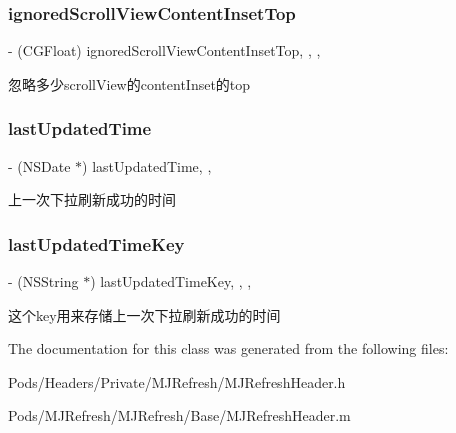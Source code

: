 \subsubsection{\texorpdfstring{ignored\+Scroll\+View\+Content\+Inset\+Top}{ignoredScrollViewContentInsetTop}}
{\footnotesize\ttfamily -\/ (C\+G\+Float) ignored\+Scroll\+View\+Content\+Inset\+Top\hspace{0.3cm}{\ttfamily [read]}, {\ttfamily [write]}, {\ttfamily [nonatomic]}, {\ttfamily [assign]}}

忽略多少scroll\+View的content\+Inset的top \mbox{\label{interface_m_j_refresh_header_ad673d647b3f6bbb11230437a7e739c3a}} 
\subsubsection{\texorpdfstring{last\+Updated\+Time}{lastUpdatedTime}}
{\footnotesize\ttfamily -\/ (N\+S\+Date $\ast$) last\+Updated\+Time\hspace{0.3cm}{\ttfamily [read]}, {\ttfamily [nonatomic]}, {\ttfamily [strong]}}

上一次下拉刷新成功的时间 \mbox{\label{interface_m_j_refresh_header_a271857966b0acfdf1be61a05aaf3f0ec}} 
\subsubsection{\texorpdfstring{last\+Updated\+Time\+Key}{lastUpdatedTimeKey}}
{\footnotesize\ttfamily -\/ (N\+S\+String $\ast$) last\+Updated\+Time\+Key\hspace{0.3cm}{\ttfamily [read]}, {\ttfamily [write]}, {\ttfamily [nonatomic]}, {\ttfamily [copy]}}

这个key用来存储上一次下拉刷新成功的时间 

The documentation for this class was generated from the following files\+:\begin{DoxyCompactItemize}
\item 
Pods/\+Headers/\+Private/\+M\+J\+Refresh/M\+J\+Refresh\+Header.\+h\item 
Pods/\+M\+J\+Refresh/\+M\+J\+Refresh/\+Base/M\+J\+Refresh\+Header.\+m\end{DoxyCompactItemize}
